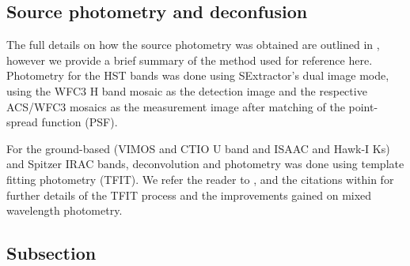 \subsection{Source photometry and deconfusion}
The full details on how the source photometry was obtained are outlined in \citet{Guo:2013ig}, however we provide a brief summary of the method used for reference here. Photometry for the HST bands was done using SExtractor's dual image mode, using the WFC3 H band mosaic as the detection image and the respective ACS/WFC3 mosaics as the measurement image after matching of the point-spread function (PSF). 

For the ground-based (VIMOS and CTIO U band and ISAAC and Hawk-I Ks) and Spitzer IRAC bands, deconvolution and photometry was done using template fitting photometry (TFIT). We refer the reader to \citet{Laidler:2007iy},\citet{2012ApJ...752...66L} and the citations within for further details of the TFIT process and the improvements gained on mixed wavelength photometry.


\subsection[Subsec]{Subsection}
\label{sec:subsec2_label}


